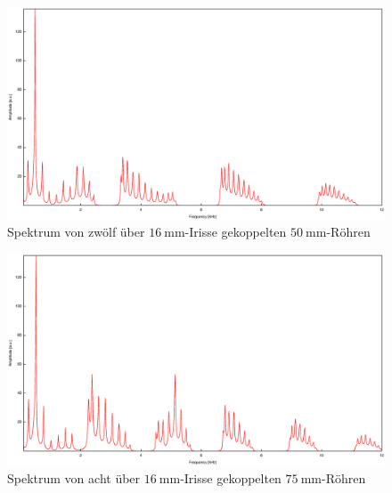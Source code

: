\begin{figure}
\centering
\includegraphics[scale=0.35]{FP-V23data/4.4_600mm_16mm.eps}
\caption{Spektrum von zwölf über $\SI{16}{\milli\meter}$-Irisse gekoppelten $\SI{50}{\milli\meter}$-Röhren}
\label{fig:12_50_16}
\end{figure}
\begin{figure}
\centering
\includegraphics[scale=0.35]{FP-V23data/4.5_600mm_16mm.eps}
\caption{Spektrum von acht über $\SI{16}{\milli\meter}$-Irisse gekoppelten $\SI{75}{\milli\meter}$-Röhren}
\label{fig:8_75_16}
\end{figure}
